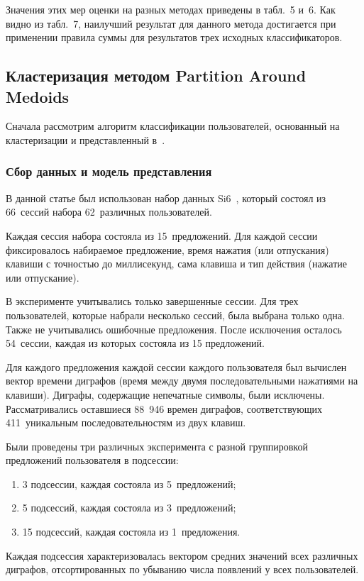 \begin{multicols}{2}
\vspace*{6pt}

Значения этих мер оценки на разных методах приведены в
табл.~5 и~6. Как видно из
табл.~7, наилучший результат для данного метода
достигается при применении правила суммы для результатов трех
исходных классификаторов.



\addtocounter{table}{3}

\subsection{Кластеризация методом Partition Around Medoids}

Сначала рассмотрим алгоритм классификации пользователей, основанный
на кластеризации и представленный в~\cite{bert}.

\subsubsection{Сбор данных и модель представления}

В данной статье был использован набор данных {Si6}~\cite{si6}, 
который состоял из 66~сессий набора 62~различных
пользователей.

Каждая сессия набора состояла из 15~предложений. Для каждой сессии
фиксировалось на\-би\-ра\-емое предложение, время нажатия (или отпускания)
клавиши с точностью до миллисекунд, сама клавиша и тип действия
(нажатие или отпускание).

В эксперименте учитывались только завершенные сессии. Для трех
пользователей, которые набрали несколько сессий, была выбрана только
одна. Также не учитывались ошибочные предложения. После исключения
осталось 54~сессии, каждая из которых состояла из 15 предложений.

Для каждого предложения каждой сессии каж\-до\-го пользователя был
вычислен вектор времени диграфов (время между двумя
последовательными нажатиями на клавиши). Диграфы, содержащие
непечатные символы, были исключены. Рас\-смат\-ри\-ва\-лись оставшиеся
88~946 времен диграфов, соответствующих 411~уникальным
последовательностям из двух клавиш.

Были проведены три различных эксперимента с разной 
группировкой предложений пользователя в подсессии:
\begin{enumerate}[(1)]
    \item 3 подсессии, каждая состояла из 5~предложений;
    \item 5 подсессий, каждая состояла из 3~предложений;
    \item 15 подсессий, каждая состояла из 1~предложения.
\end{enumerate}
Каждая подсессия характеризовалась вектором средних значений всех
различных диграфов, отсортированных по убыванию числа появлений у
всех пользователей.


\end{multicols}
